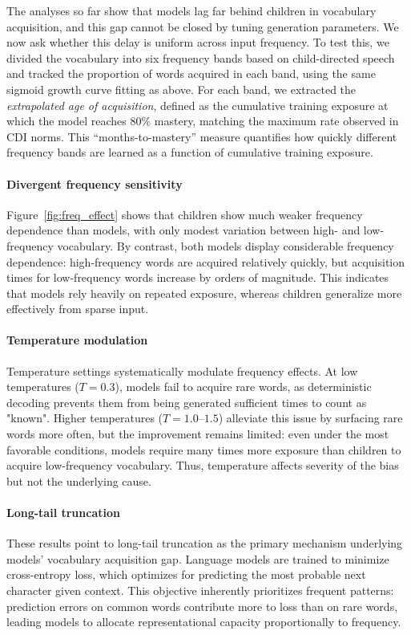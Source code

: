 The analyses so far show that models lag far behind children in vocabulary acquisition, and this gap cannot be closed by tuning generation parameters. We now ask whether this delay is uniform across input frequency. To test this, we divided the vocabulary into six frequency bands based on child-directed speech and tracked the proportion of words acquired in each band, using the same sigmoid growth curve fitting as above. For each band, we extracted the \textit{extrapolated age of acquisition}, defined as the cumulative training exposure at which the model reaches 80\% mastery, matching the maximum rate observed in CDI norms. This “months-to-mastery” measure quantifies how quickly different frequency bands are learned as a function of cumulative training exposure.


\paragraph{Divergent frequency sensitivity} Figure~\ref{fig:freq_effect} shows that children show much weaker frequency dependence than models, with only modest variation between high- and low-frequency vocabulary. By contrast, both models display considerable frequency dependence: high-frequency words are acquired relatively quickly, but acquisition times for low-frequency words increase by orders of magnitude. This indicates that models rely heavily on repeated exposure, whereas children generalize more effectively from sparse input.


\paragraph{Temperature modulation} Temperature settings systematically modulate frequency effects. At low temperatures ($T=0.3$), models fail to acquire rare words, as deterministic decoding prevents them from being generated sufficient times to count as "known". Higher temperatures ($T=1.0$–$1.5$) alleviate this issue by surfacing rare words more often, but the improvement remains limited: even under the most favorable conditions, models require many times more exposure than children to acquire low-frequency vocabulary. Thus, temperature affects severity of the bias but not the underlying cause.


\paragraph{Long-tail truncation} These results point to long-tail truncation as the primary mechanism underlying models' vocabulary acquisition gap. Language models are trained to minimize cross-entropy loss, which optimizes for predicting the most probable next character given context. This objective inherently prioritizes frequent patterns: prediction errors on common words contribute more to loss than on rare words, leading models to allocate representational capacity proportionally to frequency. 


